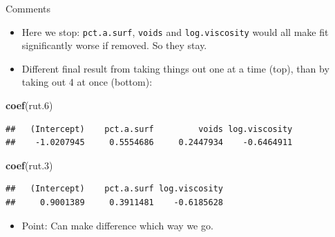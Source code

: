 \documentclass[ignorenonframetext,]{beamer}
\newenvironment{Shaded}{\begin{snugshade}}{\end{snugshade}}
\newcommand{\FloatTok}[1]{\textcolor[rgb]{0.00,0.00,0.81}{#1}}
\newcommand{\KeywordTok}[1]{\textcolor[rgb]{0.13,0.29,0.53}{\textbf{#1}}}
\newcommand{\NormalTok}[1]{#1}
\providecommand{\tightlist}{%
  \setlength{\itemsep}{0pt}\setlength{\parskip}{0pt}}
\begin{document}
\begin{frame}[fragile]{Comments}
\protect\hypertarget{comments-21}{}

\begin{itemize}
\tightlist
\item
  Here we stop: \texttt{pct.a.surf}, \texttt{voids} and
  \texttt{log.viscosity} would all make fit significantly worse if
  removed. So they stay.
\item
  Different final result from taking things out one at a time (top),
  than by taking out 4 at once (bottom):
\end{itemize}

\begin{Shaded}
\begin{Highlighting}[]
\KeywordTok{coef}\NormalTok{(rut}\FloatTok{.6}\NormalTok{)}
\end{Highlighting}
\end{Shaded}

\begin{verbatim}
##   (Intercept)    pct.a.surf         voids log.viscosity 
##    -1.0207945     0.5554686     0.2447934    -0.6464911
\end{verbatim}

\begin{Shaded}
\begin{Highlighting}[]
\KeywordTok{coef}\NormalTok{(rut}\FloatTok{.3}\NormalTok{)}
\end{Highlighting}
\end{Shaded}

\begin{verbatim}
##   (Intercept)    pct.a.surf log.viscosity 
##     0.9001389     0.3911481    -0.6185628
\end{verbatim}

\begin{itemize}
\tightlist
\item
  Point: Can make difference which way we go.
\end{itemize}

\end{frame}
\end{document}

